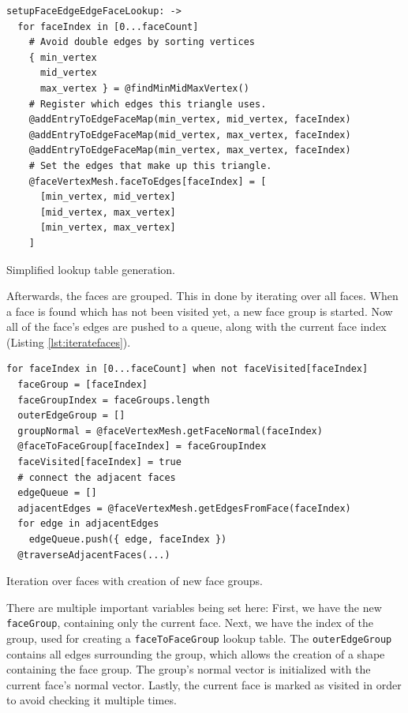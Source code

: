 \documentclass[../ClassicThesis.tex]{subfiles}
\begin{document}
\begin{listing}
\begin{verbatim}
setupFaceEdgeEdgeFaceLookup: ->
  for faceIndex in [0...faceCount]
    # Avoid double edges by sorting vertices
    { min_vertex
      mid_vertex
      max_vertex } = @findMinMidMaxVertex()
    # Register which edges this triangle uses.
    @addEntryToEdgeFaceMap(min_vertex, mid_vertex, faceIndex)
    @addEntryToEdgeFaceMap(mid_vertex, max_vertex, faceIndex)
    @addEntryToEdgeFaceMap(min_vertex, max_vertex, faceIndex)
    # Set the edges that make up this triangle.
    @faceVertexMesh.faceToEdges[faceIndex] = [
      [min_vertex, mid_vertex]
      [mid_vertex, max_vertex]
      [min_vertex, max_vertex]
    ]
\end{verbatim}
\caption{Simplified lookup table generation.}
\label{lst:lookuptables}
\end{listing}

Afterwards, the faces are grouped. This in done by iterating over all faces. When a face is found which has not been visited yet, a new face group is started. Now all of the face's edges are pushed to a queue, along with the current face index (Listing \ref{lst:iteratefaces}).

\begin{listing}
\begin{verbatim}
for faceIndex in [0...faceCount] when not faceVisited[faceIndex]
  faceGroup = [faceIndex]
  faceGroupIndex = faceGroups.length
  outerEdgeGroup = []
  groupNormal = @faceVertexMesh.getFaceNormal(faceIndex)
  @faceToFaceGroup[faceIndex] = faceGroupIndex
  faceVisited[faceIndex] = true
  # connect the adjacent faces
  edgeQueue = []
  adjacentEdges = @faceVertexMesh.getEdgesFromFace(faceIndex)
  for edge in adjacentEdges
    edgeQueue.push({ edge, faceIndex })
  @traverseAdjacentFaces(...)
\end{verbatim}
\caption{Iteration over faces with creation of new face groups.}
\label{lst:iteratefaces}
\end{listing}

There are multiple important variables being set here: First, we have the new \texttt{faceGroup}, containing only the current face. Next, we have the index of the group, used for creating a \texttt{faceToFaceGroup} lookup table. The \texttt{outerEdgeGroup} contains all edges surrounding the group, which allows the creation of a shape containing the face group. The group's normal vector is initialized with the current face's normal vector. Lastly, the current face is marked as visited in order to avoid checking it multiple times.
\end{document}

